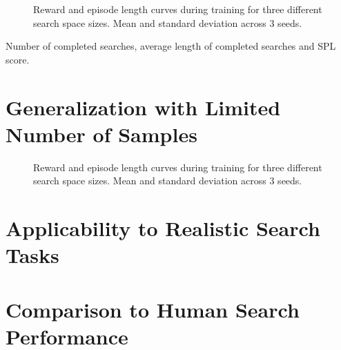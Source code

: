 \begin{figure}
    \centering
    \label{fig:train-shape}
    \caption[Search space size learning curve.]{Reward and episode length curves during training for three different search space sizes. Mean and standard deviation across 3 seeds.}
\end{figure}

\begin{table}
    \caption[Search space performance metrics.]{Number of completed searches, average length of completed searches and SPL score.}
    \centering
    \label{tab:test-shape}
\end{table}

\section{Generalization with Limited Number of Samples}

\begin{figure}
    \centering
    \label{fig:samples}
    \caption[Generalization results.]{Reward and episode length curves during training for three different search space sizes. Mean and standard deviation across 3 seeds.}
\end{figure}


\section{Applicability to Realistic Search Tasks}



\section{Comparison to Human Search Performance}
